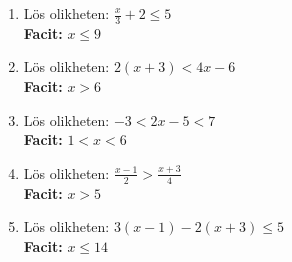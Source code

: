 \documentclass[a4paper,11pt]{article}
\begin{document}
\begin{enumerate}[label=\textbf{\arabic*.}]
    \item Lös olikheten: $\frac{x}{3} + 2 \leq 5$
    \\ \textbf{Facit:} $x \leq 9$
    
    \item Lös olikheten: $2(x + 3) < 4x - 6$
    \\ \textbf{Facit:} $x > 6$
    
    \item Lös olikheten: $-3 < 2x - 5 < 7$
    \\ \textbf{Facit:} $1 < x < 6$
    
    \item Lös olikheten: $\frac{x-1}{2} > \frac{x+3}{4}$
    \\ \textbf{Facit:} $x > 5$
    
    \item Lös olikheten: $3(x - 1) - 2(x + 3) \leq 5$
    \\ \textbf{Facit:} $x \leq 14$
\end{enumerate}
\end{document}

